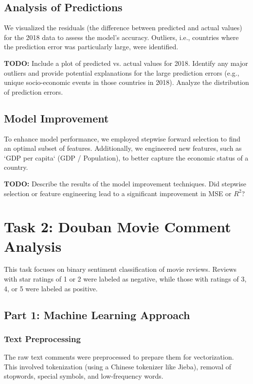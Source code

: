 \documentclass{article}
\begin{document}
\subsection{Analysis of Predictions}
\label{ssec:analysis_preds}

We visualized the residuals (the difference between predicted and actual values) for the 2018 data to assess the model's accuracy. Outliers, i.e., countries where the prediction error was particularly large, were identified.

\textbf{TODO:} Include a plot of predicted vs. actual values for 2018. Identify any major outliers and provide potential explanations for the large prediction errors (e.g., unique socio-economic events in those countries in 2018). Analyze the distribution of prediction errors.

\subsection{Model Improvement}
\label{ssec:model_improvement}

To enhance model performance, we employed stepwise forward selection to find an optimal subset of features. Additionally, we engineered new features, such as `GDP per capita` (GDP / Population), to better capture the economic status of a country.

\textbf{TODO:} Describe the results of the model improvement techniques. Did stepwise selection or feature engineering lead to a significant improvement in MSE or $R^2$?

\section{Task 2: Douban Movie Comment Analysis}
\label{sec:task2}

This task focuses on binary sentiment classification of movie reviews. Reviews with star ratings of 1 or 2 were labeled as negative, while those with ratings of 3, 4, or 5 were labeled as positive.

\subsection{Part 1: Machine Learning Approach}
\label{ssec:ml_approach}

\subsubsection{Text Preprocessing}
\label{sssec:preprocessing}
The raw text comments were preprocessed to prepare them for vectorization. This involved tokenization (using a Chinese tokenizer like Jieba), removal of stopwords, special symbols, and low-frequency words.
\end{document}
